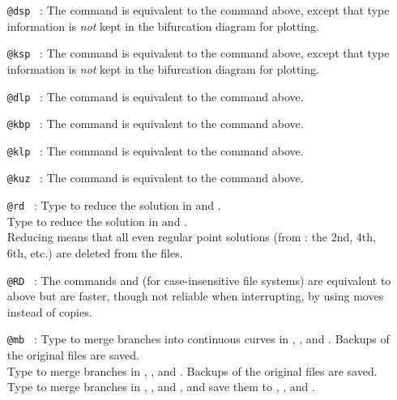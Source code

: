 \documentclass[12pt]{report}
\begin{document}
\begin{itemize}
\item[\tt @dsp]~:
  The command  is equivalent to the command 
  above, except that
  type information is \emph{not} kept in the bifurcation diagram for plotting.

\item[\tt @ksp]~:
  The command  is equivalent to the command 
  above, except that
  type information is \emph{not} kept in the bifurcation diagram for plotting.

\item[\tt @dlp]~:
  The command  is equivalent to the command 
  above.

\item[\tt @kbp]~:
  The command  is equivalent to the command 
  above.

\item[\tt @klp]~:
  The command  is equivalent to the command 
  above.

\item[\tt @kuz]~:
  The command  is equivalent to the command 
  above.

\item[\tt @rd]~:
  Type  to reduce the solution in 
  and .\\
  Type  to reduce the solution in  and
  .\\
  Reducing means that all even regular point solutions
  (from : the 2nd, 4th, 6th,  etc.) are deleted from the files.

\item[\tt @RD]~:
  The commands  and  (for
  case-insensitive file systems) are equivalent to 
  above but are faster, though not reliable when interrupting,
  by using moves instead of copies.

\item[\tt @mb]~:
  Type  to merge branches into continuous curves
  in , , and .  Backups of the
  original files are saved.\\
  Type  to merge branches in ,
  , and .  Backups of the
  original files are saved.\\
  Type  to merge branches in ,
  , and ,
  and save them to , , and .


\end{itemize}
\end{document}
